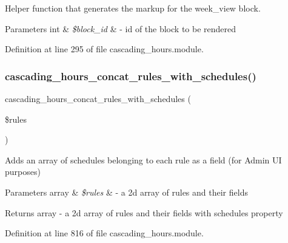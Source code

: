 Helper function that generates the markup for the week\+\_\+view block. 


\begin{DoxyParams}[1]{Parameters}
int & {\em \$block\+\_\+id} & -\/ id of the block to be rendered \\
\hline
\end{DoxyParams}


Definition at line 295 of file cascading\+\_\+hours.\+module.

\mbox{\label{cascading__hours_8module_a62c7e94585316cfd40512535a11a1910_a62c7e94585316cfd40512535a11a1910}} 
\subsubsection{\texorpdfstring{cascading\+\_\+hours\+\_\+concat\+\_\+rules\+\_\+with\+\_\+schedules()}{cascading\_hours\_concat\_rules\_with\_schedules()}}
{\footnotesize\ttfamily cascading\+\_\+hours\+\_\+concat\+\_\+rules\+\_\+with\+\_\+schedules (\begin{DoxyParamCaption}\item[{}]{\$rules }\end{DoxyParamCaption})}



Adds an array of schedules belonging to each rule as a field (for Admin UI purposes) 


\begin{DoxyParams}[1]{Parameters}
array & {\em \$rules} & -\/ a 2d array of rules and their fields \\
\hline
\end{DoxyParams}
\begin{DoxyReturn}{Returns}
array -\/ a 2d array of rules and their fields with schedules property 
\end{DoxyReturn}


Definition at line 816 of file cascading\+\_\+hours.\+module.

\mbox{\label{cascading__hours_8module_aecc88103b29ba98defaf874cdb56343b_aecc88103b29ba98defaf874cdb56343b}} 

